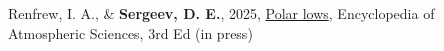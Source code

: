 \item[\small{\highlightdark{\textbf{\textbullet}}}] Renfrew, I. A., \& \textbf{Sergeev, D. E.}, 2025, \href{https://doi.org/10.1016/B978-0-323-96026-7.00102-8}{Polar lows}, Encyclopedia of Atmospheric Sciences, 3rd Ed (in press)